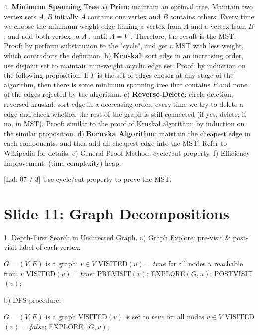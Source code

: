 \documentclass[10pt,a4paper]{article}
\begin{document}
4. \textbf{Minimum Spanning Tree}
a) \textbf{Prim}: maintain an optimal tree. Maintain two vertex sets \(A,B\) initially \(A\) contains one vertex and \(B\) contains others. Every time we choose the minimum-weight edge linking a vertex from \(A\) and a vertex from \(B\) , and add both vertex to \(A\) , until \(A = V\) . Therefore, the result is the MST.
Proof: by perform substitution to the "cycle", and get a MST with less weight, which contradicts the definition.
b) \textbf{Kruskal}: sort edge in an increasing order, use disjoint set to maintain min-weight acyclic edge set;
Proof: by induction on the following proposition: If \(F\) is the set of edges chosen at any stage of the algorithm, then there is some minimum spanning tree that contains \(F\) and none of the edges rejected by the algorithm.
c) \textbf{Reverse-Delete}: circle-deletion, reversed-kruskal. sort edge in a decreasing order, every time we try to delete a edge and check whether the rest of the graph is still connected (if yes, delete; if no, in MST).
Proof: similar to the proof of Kruskal algorithm; by induction on the similar proposition.
d) \textbf{Boruvka Algorithm}: maintain the cheapest edge in each components, and then add all cheapest edge into the MST. Refer to Wikipedia for details.
e) General Proof Method: cycle/cut property.
f) Efficiency Improvement: (time complexity) heap.

[Lab 07 / 3] Use cycle/cut property to prove the MST.

\section*{Slide 11: Graph Decompositions}

1. Depth-First Search in Undirected Graph.
a) Graph Explore: pre-visit \& post-visit label of each vertex.
\begin{algorithm}
\caption{EXPLORE\((G, v)\)}
\begin{algorithmic}[1]
\Input \(G = (V,E)\) is a graph; \(v \in V\)
\Output VISITED\((u) = true\) for all nodes \(u\) reachable from \(v\)
\State VISITED\((v) = true\);
\State PREVISIT\((v)\);
        \State EXPLORE\((G, u)\);
    \EndIf
\EndFor
\State POSTVISIT\((v)\);
\end{algorithmic}
\end{algorithm}

b) DFS procedure:
\begin{algorithm}
\caption{DFS\((G)\)}
\begin{algorithmic}[1]
\Input \(G = (V,E)\) is a graph
\Output VISITED\((v)\) is set to \(true\) for all nodes \(v \in V\)
    \State VISITED\((v) = false\);
\EndFor
{}
        \State EXPLORE\((G, v)\);
    \EndIf
\EndFor
\end{algorithmic}
\end{algorithm}
\end{document}
